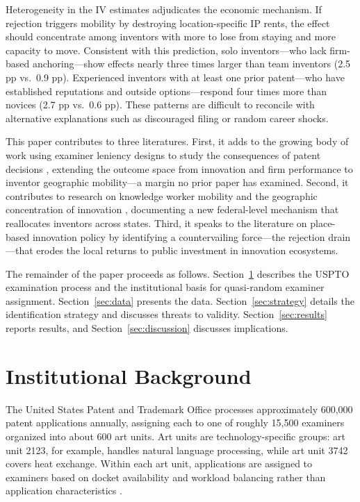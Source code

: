 \documentclass[12pt]{article}
\begin{document}
Heterogeneity in the IV estimates adjudicates the economic mechanism. If rejection triggers mobility by destroying location-specific IP rents, the effect should concentrate among inventors with more to lose from staying and more capacity to move. Consistent with this prediction, solo inventors---who lack firm-based anchoring---show effects nearly three times larger than team inventors (2.5 pp vs.\ 0.9 pp). Experienced inventors with at least one prior patent---who have established reputations and outside options---respond four times more than novices (2.7 pp vs.\ 0.6 pp). These patterns are difficult to reconcile with alternative explanations such as discouraged filing or random career shocks.

This paper contributes to three literatures. First, it adds to the growing body of work using examiner leniency designs to study the consequences of patent decisions \citep{galasso2015, farre-mensa2020, sampat2019, righi2023}, extending the outcome space from innovation and firm performance to inventor geographic mobility---a margin no prior paper has examined. Second, it contributes to research on knowledge worker mobility and the geographic concentration of innovation \citep{moretti2012, kerr2017}, documenting a new federal-level mechanism that reallocates inventors across states. Third, it speaks to the literature on place-based innovation policy \citep{gruber2019} by identifying a countervailing force---the rejection drain---that erodes the local returns to public investment in innovation ecosystems.

The remainder of the paper proceeds as follows. Section~\ref{sec:background} describes the USPTO examination process and the institutional basis for quasi-random examiner assignment. Section~\ref{sec:data} presents the data. Section~\ref{sec:strategy} details the identification strategy and discusses threats to validity. Section~\ref{sec:results} reports results, and Section~\ref{sec:discussion} discusses implications.


\section{Institutional Background}
\label{sec:background}

The United States Patent and Trademark Office processes approximately 600,000 patent applications annually, assigning each to one of roughly 15,500 examiners organized into about 600 art units. Art units are technology-specific groups: art unit 2123, for example, handles natural language processing, while art unit 3742 covers heat exchange. Within each art unit, applications are assigned to examiners based on docket availability and workload balancing rather than application characteristics \citep{lemley2012, righi2023}.
\end{document}
